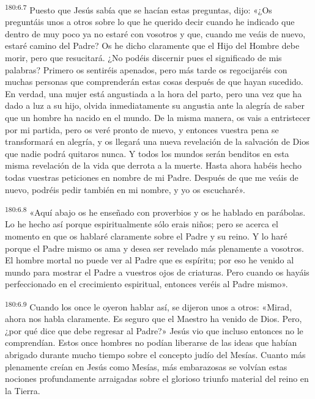 \par 
\textsuperscript{180:6.7} Puesto que Jesús sabía que se hacían estas preguntas, dijo: «¿Os preguntáis unos a otros sobre lo que he querido decir cuando he indicado que dentro de muy poco ya no estaré con vosotros y que, cuando me veáis de nuevo, estaré camino del Padre? Os he dicho claramente que el Hijo del Hombre debe morir, pero que resucitará. ¿No podéis discernir pues el significado de mis palabras? Primero os sentiréis apenados, pero más tarde os regocijaréis con muchas personas que comprenderán estas cosas después de que hayan sucedido. En verdad, una mujer está angustiada a la hora del parto, pero una vez que ha dado a luz a su hijo, olvida inmediatamente su angustia ante la alegría de saber que un hombre ha nacido en el mundo. De la misma manera, os vais a entristecer por mi partida, pero os veré pronto de nuevo, y entonces vuestra pena se transformará en alegría, y os llegará una nueva revelación de la salvación de Dios que nadie podrá quitaros nunca. Y todos los mundos serán benditos en esta misma revelación de la vida que derrota a la muerte. Hasta ahora habéis hecho todas vuestras peticiones en nombre de mi Padre. Después de que me veáis de nuevo, podréis pedir también en mi nombre, y yo os escucharé».

\par 
\textsuperscript{180:6.8} «Aquí abajo os he enseñado con proverbios y os he hablado en parábolas. Lo he hecho así porque espiritualmente sólo erais niños; pero se acerca el momento en que os hablaré claramente sobre el Padre y su reino. Y lo haré porque el Padre mismo os ama y desea ser revelado más plenamente a vosotros. El hombre mortal no puede ver al Padre que es espíritu; por eso he venido al mundo para mostrar el Padre a vuestros ojos de criaturas. Pero cuando os hayáis perfeccionado en el crecimiento espiritual, entonces veréis al Padre mismo».

\par 
\textsuperscript{180:6.9} Cuando los once le oyeron hablar así, se dijeron unos a otros: «Mirad, ahora nos habla claramente. Es seguro que el Maestro ha venido de Dios. Pero, ¿por qué dice que debe regresar al Padre?» Jesús vio que incluso entonces no le comprendían. Estos once hombres no podían liberarse de las ideas que habían abrigado durante mucho tiempo sobre el concepto judío del Mesías. Cuanto más plenamente creían en Jesús como Mesías, más embarazosas se volvían estas nociones profundamente arraigadas sobre el glorioso triunfo material del reino en la Tierra.